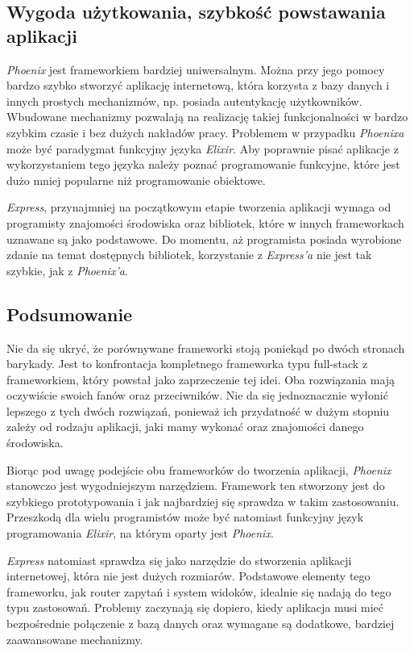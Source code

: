 \subsection{Wygoda użytkowania, szybkość powstawania aplikacji}
\emph{Phoenix} jest frameworkiem bardziej uniwersalnym. Można przy jego pomocy bardzo szybko stworzyć aplikację internetową, która korzysta z bazy danych i innych prostych mechanizmów, np. posiada autentykację użytkowników. Wbudowane mechanizmy pozwalają na realizację takiej funkcjonalności w bardzo szybkim czasie i bez dużych nakładów pracy. Problemem w przypadku \emph{Phoenixa} może być paradygmat funkcyjny języka \emph{Elixir}. Aby poprawnie pisać aplikacje z wykorzystaniem tego języka należy poznać programowanie funkcyjne, które jest dużo mniej popularne niż programowanie obiektowe.

\emph{Express}, przynajmniej na początkowym etapie tworzenia aplikacji wymaga od programisty znajomości środowiska oraz bibliotek, które w innych frameworkach uznawane są jako podstawowe. Do momentu, aż programista posiada wyrobione zdanie na temat dostępnych bibliotek, korzystanie z \emph{Express'a} nie jest tak szybkie, jak z \emph{Phoenix'a}.

\subsection{Podsumowanie}
Nie da się ukryć, że porównywane frameworki stoją poniekąd po dwóch stronach barykady. Jest to konfrontacja kompletnego frameworka typu full-stack z frameworkiem, który powstał jako zaprzeczenie tej idei. Oba rozwiązania mają oczywiście swoich fanów oraz przeciwników. Nie da się jednoznacznie wyłonić lepszego z tych dwóch rozwiązań, ponieważ ich przydatność w dużym stopniu zależy od rodzaju aplikacji, jaki mamy wykonać oraz znajomości danego środowiska.

Biorąc pod uwagę podejście obu frameworków do tworzenia aplikacji, \emph{Phoenix} stanowczo jest wygodniejszym narzędziem. Framework ten stworzony jest do szybkiego prototypowania i jak najbardziej się sprawdza w takim zastosowaniu. Przeszkodą dla wielu programistów może być natomiast funkcyjny język programowania \emph{Elixir}, na którym oparty jest \emph{Phoenix}.

\emph{Express} natomiast sprawdza się jako narzędzie do stworzenia aplikacji internetowej, która nie jest dużych rozmiarów. Podstawowe elementy tego frameworku, jak router zapytań i system widoków, idealnie się nadają do tego typu zastosowań. Problemy zaczynają się dopiero, kiedy aplikacja musi mieć bezpośrednie połączenie z bazą danych oraz wymagane są dodatkowe, bardziej zaawansowane mechanizmy.
